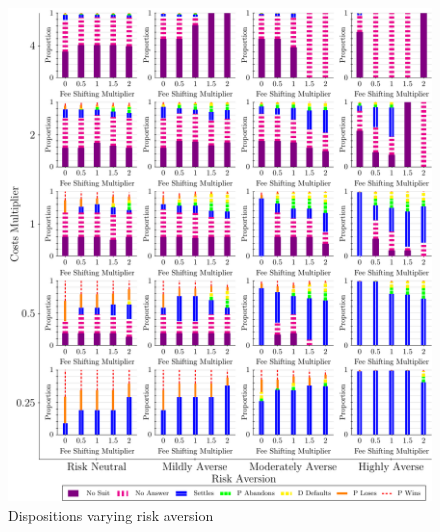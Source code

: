 \documentclass{article}
\begin{document}
\begin{figure}[h!]
\centering
\includegraphics[scale=0.50, trim={0in 0in 0in 0in}, clip]{../Figures/Disposition Varying Risk Aversion.pdf}
\caption{Dispositions varying risk aversion}
\label{fig:disposition_riskaversion}
\end{figure}
\end{document}
